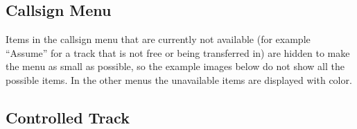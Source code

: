 \documentclass[a4paper,oneside,11pt]{memoir}
\begin{document}
\subsection{Callsign Menu}\label{menu:cs}

Items in the callsign menu that are currently not available (for example “Assume” for a track that is not free or being transferred in) are hidden to make the menu as small as possible, so the example images below do not show all the possible items. In the other menus the unavailable items are displayed with  color.

\subsection*{Controlled Track}

\end{document}
